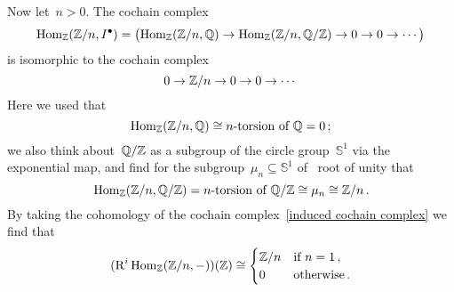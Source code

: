 Now let~$n > 0$.
The cochain complex
\[
  \operatorname{Hom}_{\mathbb{Z}}(\mathbb{Z}/n, I^\bullet)
  =
  \bigl(
  \operatorname{Hom}_{\mathbb{Z}}(\mathbb{Z}/n, \mathbb{Q})
  \to
  \operatorname{Hom}_{\mathbb{Z}}(\mathbb{Z}/n, \mathbb{Q}/\mathbb{Z})
  \to
  0
  \to
  0
  \to
  \dotsb
  \bigr)
\]
is isomorphic to the cochain complex
\begin{equation}
  \label{induced cochain complex}
  0
  \to
  \mathbb{Z}/n
  \to
  0
  \to
  0
  \to
  \dotsb
\end{equation}
Here we used that
\[
  \Hom_\Integer(\Integer/n, \Rational)
  \cong
  \text{\dash{$n$}{torsion} of~$\Rational$}
  =
  0 \,;
\]
we also think about~$\mathbb{Q}/\mathbb{Z}$ as a subgroup of the circle group~$\mathbb{S}^1$ via the exponential map, and find for the subgroup~$\mu_n \subseteq \mathbb{S}^1$ of~ root of unity that
\begin{equation}
  \label{determining torsion of QZ}
  \Hom_\Integer(\Integer/n, \Rational/\Integer)
  =
  \text{\dash{$n$}{torsion} of~$\Rational/\Integer$}
  \cong
  \mu_n
  \cong
  \Integer/n \,.
\end{equation}
By taking the cohomology of the cochain complex~\eqref{induced cochain complex} we find that
\[
  ( \operatorname{R}^i \operatorname{Hom}_{\mathbb{Z}}(\mathbb{Z}/n, -) )(\mathbb{Z})
  \cong
  \begin{cases}
    \mathbb{Z}/n  & \text{if~$n = 1$} \,, \\
    0           & \text{otherwise}  \,.
  \end{cases}
\]




